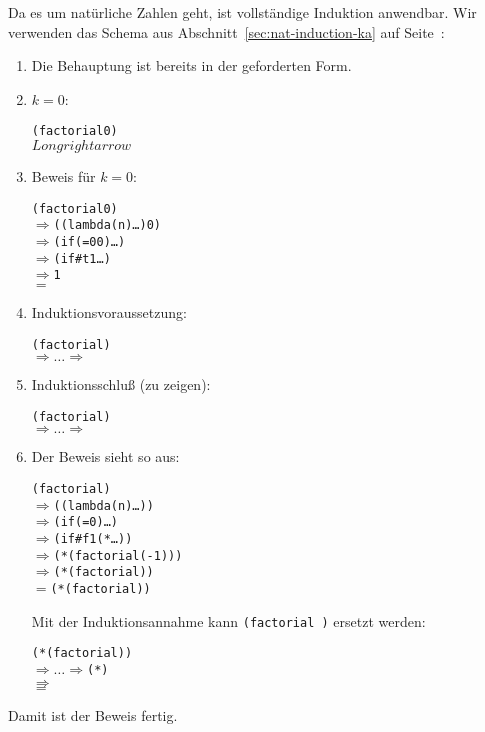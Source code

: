 Da es um natürliche Zahlen geht, ist vollständige Induktion
anwendbar.  Wir verwenden das Schema aus
Abschnitt~\ref{sec:nat-induction-ka} auf
Seite~\pageref{sec:nat-induction-ka}:
%
\begin{enumerate}
\item Die Behauptung ist bereits in der geforderten Form.
\item $k = 0$:
\begin{alltt}
(factorial 0)
\(Longrightarrow\) 
\end{alltt}
%
\item Beweis für $k=0$:
\begin{alltt}
(factorial 0)
\(\Longrightarrow\) ((lambda (n) \ldots) 0)
\(\Longrightarrow\) (if (= 0 0) \ldots)
\(\Longrightarrow\) (if #t 1 \ldots)
\(\Longrightarrow\) 1
\(=\) 
\end{alltt}
%
\item Induktionsvoraussetzung:

\begin{alltt}
(factorial )
\(\Longrightarrow\ldots\Longrightarrow\) 
\end{alltt}

\item Induktionsschluß (zu zeigen):

\begin{alltt}
(factorial )
\(\Longrightarrow\ldots\Longrightarrow\) 
\end{alltt}
\item 

Der Beweis sieht so aus:
%
\begin{alltt}
(factorial )
\(\Longrightarrow\) ((lambda (n) \ldots) )
\(\Longrightarrow\) (if (=  0) \ldots)
\(\Longrightarrow\) (if #f 1 (* \ldots))
\(\Longrightarrow\) (*  (factorial (-  1)))
\(\Longrightarrow\) (*  (factorial ))
\(=\) (*  (factorial ))
\end{alltt}
%
Mit der Induktionsannahme kann \texttt{(factorial )} ersetzt werden:
%
\begin{alltt}
(*  (factorial ))
\(\Longrightarrow\ldots\Longrightarrow\) (*  )
\(\Longrightarrow\) 
\(=\) 
\end{alltt}
%
\end{enumerate}

Damit ist der Beweis fertig.

